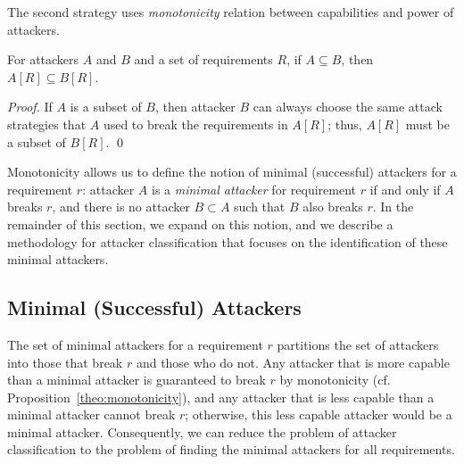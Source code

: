 {The second strategy uses \emph{monotonicity} relation between capabilities and power of attackers.
\begin{proposition}[Monotonicity]
\label{theo:monotonicity}
For attackers $A$ and $B$ and a set of requirements $R$, if $A\subseteq B$, then $A[R]\subseteq B[R]$.
\end{proposition}
\begin{proof}
If $A$ is a subset of $B$, then attacker $B$ can always choose the same attack strategies that $A$ used to break the requirements in $A[R]$; thus, $A[R]$ must be a subset of $B[R]$.
 \qed
\end{proof}
Monotonicity allows us to define the notion of {minimal (successful) attackers} for a requirement $r$: attacker $A$ is a \emph{minimal attacker} for requirement $r$ if and only if $A$ breaks $r$, and there is no attacker $B\subset A$ such that $B$ also breaks $r$. In the remainder of this section, we expand on this notion, and we describe a methodology for attacker classification that focuses on the identification of these minimal attackers. %

\subsection{Minimal (Successful) Attackers}
The set of minimal attackers for a requirement $r$ partitions the set of attackers into those that break $r$ and those who do not. Any attacker that is more capable than a minimal attacker is guaranteed to break $r$ by monotonicity (cf. Proposition~\ref{theo:monotonicity}), and any attacker that is less capable than a minimal attacker cannot break $r$; otherwise, this less capable attacker would be a minimal attacker. Consequently, we can reduce the problem of attacker classification to the problem of finding the minimal attackers for all requirements.

}
